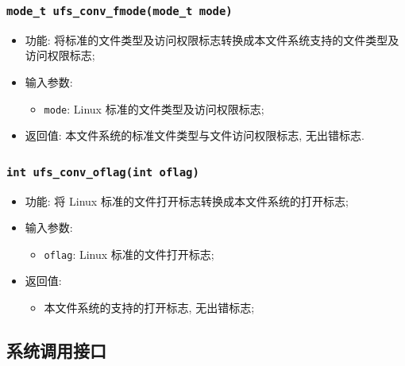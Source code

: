\documentclass[nofonts]{ctexart}
\begin{document}
  \subsubsection{\texttt{mode\_t ufs\_conv\_fmode(mode\_t mode)}}
  \begin{itemize}
\item
  功能:
  将标准的文件类型及访问权限标志转换成本文件系统支持的文件类型及访问权限标志;
\item
  输入参数:

  \begin{itemize}
  \item
    \texttt{mode}: Linux 标准的文件类型及访问权限标志;
  \end{itemize}
\item
  返回值: 本文件系统的标准文件类型与文件访问权限标志, 无出错标志.
  \end{itemize}
  \subsubsection{\texttt{int ufs\_conv\_oflag(int oflag)}}
  \begin{itemize}
\item
  功能: 将 Linux 标准的文件打开标志转换成本文件系统的打开标志;
\item
  输入参数:

  \begin{itemize}
  \item
    \texttt{oflag}: Linux 标准的文件打开标志;
  \end{itemize}
\item
  返回值:

  \begin{itemize}
  \item
    本文件系统的支持的打开标志, 无出错标志;
  \end{itemize}
\end{itemize}

\subsection{系统调用接口}\label{ux7cfbux7edfux8c03ux7528ux63a5ux53e3}
\end{document}
